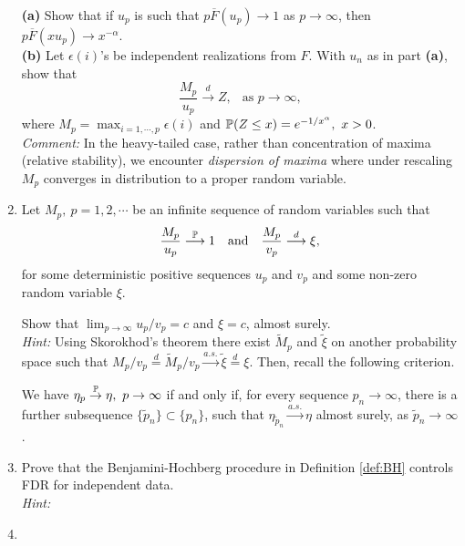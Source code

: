 \begin{enumerate}
{\bf (a)} Show that if $u_p$ is such that $p\overline F(u_p)\to 1$ as $p\to\infty$, then $p \overline F(x u_p)\to x^{-\alpha}$.\\

{\bf (b)} Let $\epsilon(i)$'s be independent realizations from $F$. With $u_n$ as in part {\bf (a)}, show that
$$ 
\frac{M_p}{u_p} \stackrel{d}{\longrightarrow} Z,\ \ \mbox{ as }p\to\infty,
$$ 
where $M_p = \max_{i=1,\cdots,p} \epsilon(i)$ and $\P(Z\le x) = e^{-1/x^\alpha},\ x>0$.\\

{\em Comment:} In the heavy-tailed case, rather than concentration of maxima (relative stability),
we encounter {\em dispersion of maxima} where under rescaling $M_p$ converges in distribution to a proper random variable.\\

\item Let  $M_p,\ p=1,2,\cdots$  be an infinite sequence of random variables such that
$$
\frac{M_p}{u_p} \stackrel{\P}{\longrightarrow} 1\ \ \mbox{ and }\ \ \frac{M_p}{v_p} \stackrel{d}{\longrightarrow} \xi,
$$
for some deterministic positive sequences  $u_p$ and $v_p$ and some non-zero random variable $\xi$.

Show that $\lim_{p\to\infty} u_p/v_p = c$ and $\xi = c$, almost surely.\\

{\em Hint:} Using Skorokhod's theorem there exist $\widetilde M_p$ and $\widetilde \xi$ on another probability space
such that $M_p/v_p\stackrel{d}{=}\widetilde M_p/v_p \stackrel{a.s.}{\to} \widetilde \xi \stackrel{d}{=}\xi$.
Then, recall the following criterion.

\begin{lemma} We have $\eta_p\stackrel{\P}{\to} \eta,\ p\to\infty$ if and only if, for every sequence $p_n\to \infty$, there is a further
subsequence $\{\widetilde p_n\}\subset\{p_n\}$, such that $\eta_{\widetilde p_n} \stackrel{a.s.}{\to} \eta$ almost surely, as $\widetilde p_n\to
\infty$.
\end{lemma}

\item Prove that the Benjamini-Hochberg procedure in Definition \ref{def:BH} controls FDR for independent data.\\

{\em Hint:} 

\item  
\end{enumerate}

